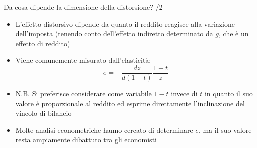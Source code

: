 \documentclass[aspectratio=64,11pt]{beamer}
\begin{document}
\begin{frame}{Da cosa dipende la dimensione della distorsione? /2}
\begin{itemize}
\item L'effetto distorsivo dipende da quanto il reddito reagisce alla variazione dell'imposta (tenendo conto dell'effetto indiretto determinato da $g$, che è un effetto di reddito)
\item Viene comunemente misurato dall'elasticità:
$$ e = -\dfrac{dz}{d(1-t)}\dfrac{1-t}{z}  $$
\item N.B. Si preferisce considerare come variabile $1-t$ invece di $t$ in quanto
il suo valore è proporzionale al reddito ed esprime direttamente
l'inclinazione del vincolo di bilancio
\item Molte analisi econometriche hanno cercato di determinare $e$, ma il suo valore resta ampiamente dibattuto tra gli economisti
\end{itemize}
\end{frame}
\end{document}
